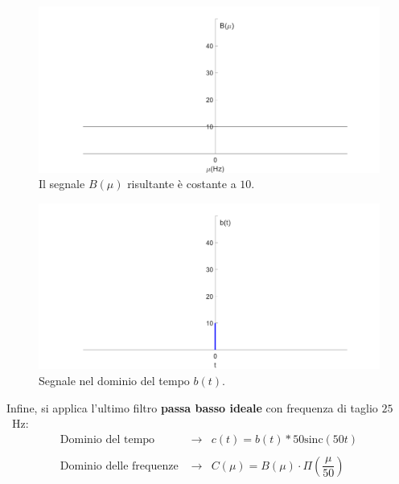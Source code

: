 \documentclass[a4paper]{article}
\begin{document}
	\begin{figure}[!htp]
		\centering
		\includegraphics[width=\textwidth]{img/segnale_B.PNG}
		\caption*{Il segnale $B\left(\mu\right)$ risultante è costante a $10$.}
	\end{figure}
	
	\begin{figure}[!htp]
		\centering
		\includegraphics[width=\textwidth]{img/segnale_b-tempo.PNG}
		\caption*{Segnale nel dominio del tempo $b\left(t\right)$.}
	\end{figure}\newpage

	\noindent
	Infine, si applica l'ultimo filtro \textbf{passa basso ideale} con frequenza di taglio $25$~Hz:
	\begin{equation*}
		\begin{array}{lll}
			\text{Dominio del tempo } & \longrightarrow & c\left(t\right) = b\left(t\right) * 50\mathrm{sinc}\left(50t\right) \\
			&& \\
			\text{Dominio delle frequenze } & \longrightarrow & C\left(\mu\right) = B\left(\mu\right) \cdot \Pi\left(\dfrac{\mu}{50}\right)
		\end{array}
	\end{equation*}
	
\end{document}
